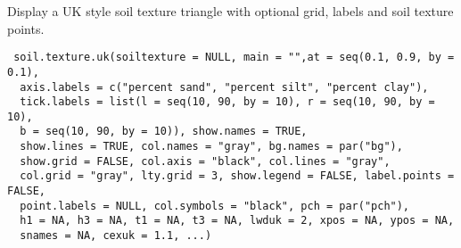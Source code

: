 \begin{Description}\relax
Display a UK style soil texture triangle with optional grid, labels and
soil texture points.
\end{Description}
\begin{Usage}
\begin{verbatim}
 soil.texture.uk(soiltexture = NULL, main = "",at = seq(0.1, 0.9, by = 0.1),
  axis.labels = c("percent sand", "percent silt", "percent clay"),
  tick.labels = list(l = seq(10, 90, by = 10), r = seq(10, 90, by = 10),
  b = seq(10, 90, by = 10)), show.names = TRUE,
  show.lines = TRUE, col.names = "gray", bg.names = par("bg"),
  show.grid = FALSE, col.axis = "black", col.lines = "gray",
  col.grid = "gray", lty.grid = 3, show.legend = FALSE, label.points = FALSE,
  point.labels = NULL, col.symbols = "black", pch = par("pch"),
  h1 = NA, h3 = NA, t1 = NA, t3 = NA, lwduk = 2, xpos = NA, ypos = NA,
  snames = NA, cexuk = 1.1, ...)
\end{verbatim}
\end{Usage}
